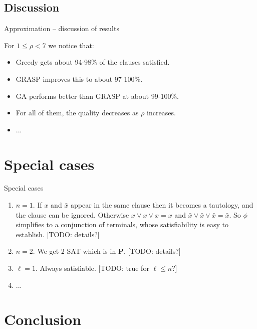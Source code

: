 \documentclass[aspectratio=169, compress, xcolor=table,xcolor=dvipsnames]{beamer}
\newcommand{\cp}{\textbf{P}}
\renewcommand{\lnot}{\bar}
\begin{document}
\subsection{Discussion}

\begin{frame}
	{Approximation -- discussion of results}

For $1\leq \rho<7$ we notice that:
\begin{itemize}
	\item Greedy gets about 94-98\% of the clauses satisfied.
	\item GRASP improves this to about 97-100\%.
	\item GA performs better than GRASP at about 99-100\%.
	\item For all of them, the quality decreases as $\rho$ increases.
	\item ...
\end{itemize}
\end{frame}

%
%
%
%

\section{Special cases}

\begin{frame}
{Special cases}

\begin{enumerate}
	\item $n=1$. If $x$ and $\lnot x$ appear in the same clause then it becomes a tautology, and the clause can be ignored. Otherwise $x\lor x\lor x = x$ and $\lnot x\lor \lnot x\lor \lnot x = \lnot x$. So $\phi$ simplifies to a conjunction of terminals, whose satisfiability is easy to establish. [TODO: details?]
	\item $n=2$. We get 2-SAT which is in \cp. [TODO: details?]
	\item $\ell=1$. Always satisfiable. [TODO: true for $\ell\leq n$?]
	\item ...
\end{enumerate}

\end{frame}
%
%
%
%

\section{Conclusion}
\end{document}
